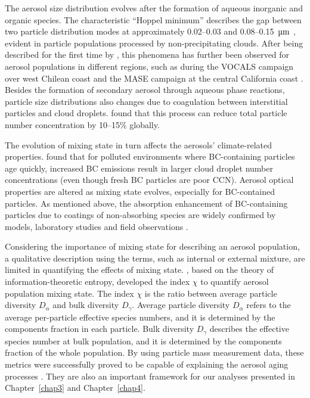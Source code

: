 \documentclass[edeposit,fullpage]{uiucthesis2009}
\newcommand{\jcedits}[1]{{\color{blue} #1}}
\begin{document}
The aerosol size distribution evolves after the formation of aqueous
inorganic and organic species. The characteristic ``Hoppel minimum''
describes the gap between two particle distribution modes at
approximately 0.02--0.03 and 0.08--0.15~$\rm \mu m$
\citep{Hoppel1986}, evident in particle populations processed by
non-precipitating clouds. After being described for the first time by
\citet{Hoppel1986}, this phenomena has further been observed for
aerosol populations in different regions, such as during the VOCALS
campaign over west Chilean coast \citep{kleinman2012aerosol} and the
MASE campaign at the central California coast
\citep{hudson2015cloud}. Besides the formation of secondary aerosol
through aqueous phase reactions, particle size distributions also
changes due to coagulation between interstitial particles and cloud
droplets. \citet{pierce2015importance} found that this process can
reduce total particle number concentration by 10--15\% globally.

The evolution of mixing state in turn affects the aerosols'
climate-related properties. \citet{Ching2016} found that for polluted
environments where BC-containing particles age quickly, increased BC
emissions result in larger cloud droplet number concentrations (even
though fresh BC particles are poor CCN). Aerosol optical properties
are altered as mixing state evolves, especially for BC-contained
particles. As mentioned above, the absorption enhancement of
BC-containing particles due to coatings of non-absorbing species are
widely confirmed by models, laboratory studies and field observations
\citep{Moffet2009,Liu2017,wu2020light,Fierce2020}.

Considering the importance of mixing state for describing an aerosol
population, a qualitative description using the terms, such as
internal or external mixture, are limited in quantifying the effects
of mixing state. \citet{Riemer2013a}, based on the theory of
information-theoretic entropy, developed the index $\chi$ to quantify
aerosol population mixing state. The index $\chi$ is the ratio between
average particle diversity $D_{\alpha}$ and bulk diversity
$D_{\gamma}$. \jcedits{Average particle diversity $D_{\alpha}$ refers to the average 
per-particle effective species numbers, and it is determined by the components
fraction in each particle. Bulk diversity $D_{\gamma}$ describes 
the effective species number at bulk population, and it is determined by the components
fraction of the whole population.} 
By using particle mass measurement data, these metrics
were successfully proved to be capable of explaining the aerosol aging
processes \citep{Healy2014}. They are also an important framework for
our analyses presented in Chapter~\ref{chap3} and Chapter~\ref{chap4}.
\end{document}
